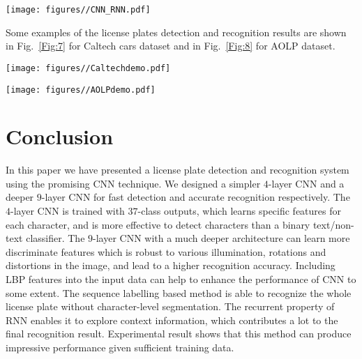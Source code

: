 \documentclass[twocolumn]{svjour3}
\begin{document}
\begin{figure*}[t!]
\centering
\texttt{[image: figures//CNN\_RNN.pdf]}
\caption{License plate recognition confidence maps. The first row is the detected license plate. The second row is the recognition probabilities from the soft-max layer of CNN. The third row is the recognition probabilities from BRNN. For each confidence map, the recognition probabilities of current sub-window on $37$-class are shown vertically (with classes order from top to bottom: non-character, $0$-$9$, A-Z). BRNN gives better recognition results. Characters on each license plate can be read straightforward from the outputs of BRNN.}
\label{Fig:9}
\end{figure*}
Some examples of the license plates detection and recognition results are shown in Fig.~\ref{Fig:7} for Caltech cars dataset and in Fig.~\ref{Fig:8} for AOLP dataset.

\begin{figure*}[tb]
\centering
\texttt{[image: figures//Caltechdemo.pdf]}
\caption{Examples of license plate detection and recognition on the Caltech cars dataset. The red rectangles are the ground-truth,
while the green ones are our detection results. The yellow tags present the recognition results.}
\label{Fig:7}
\end{figure*}\begin{figure*}[tb]
\centering
\texttt{[image: figures//AOLPdemo.pdf]}
\caption{Examples of license plate detection and recognition on the AOLP dataset. The green rectangles shows our detection results, with the recognition results presented in the yellow tags. The results demonstrate the robustness of our methods. It can detect and recognize license plates under various illuminations and orientations.}
\label{Fig:8}
\end{figure*}

\section{Conclusion}\label{SEC:Con}In this paper we have presented a license plate detection and recognition system using the promising CNN technique. We designed a simpler $4$-layer CNN and a deeper $9$-layer CNN for fast detection and accurate recognition respectively. The $4$-layer CNN is trained with $37$-class outputs, which learns specific features for each character, and is more effective to detect characters than a binary text/non-text classifier. The $9$-layer CNN with a much deeper architecture can learn more discriminate features which is robust to various illumination, rotations and distortions in the image, and lead to a higher recognition accuracy. Including LBP features into the input data can help to enhance the performance of CNN to some extent. The sequence labelling based method is able to recognize the whole license plate without character-level segmentation. The recurrent property of RNN enables it to explore context information, which contributes a lot to the final recognition result. Experimental result shows that this method can produce impressive performance given sufficient training data.
\end{document}
